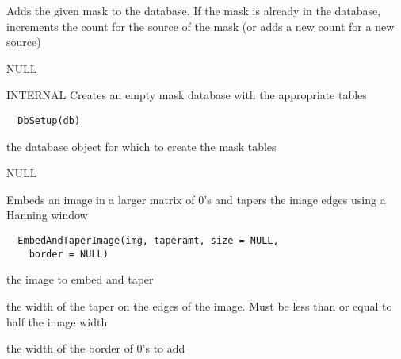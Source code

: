 \documentclass[a4paper]{book}
\begin{document}
%
\begin{Details}\relax
Adds the given mask to the database.  If the mask is
already in the database, increments the count for the
source of the mask (or adds a new count for a new source)
\end{Details}
%
\begin{Value}
NULL
\end{Value}
%
\begin{Description}\relax
INTERNAL Creates an empty mask database with the
appropriate tables
\end{Description}
%
\begin{Usage}
\begin{verbatim}
  DbSetup(db)
\end{verbatim}
\end{Usage}
%
\begin{Arguments}
\begin{ldescription}
\item[\code{db}] the database object for which to create the
mask tables
\end{ldescription}
\end{Arguments}
%
\begin{Value}
NULL
\end{Value}
%
\begin{Description}\relax
Embeds an image in a larger matrix of 0's and tapers the
image edges using a Hanning window
\end{Description}
%
\begin{Usage}
\begin{verbatim}
  EmbedAndTaperImage(img, taperamt, size = NULL,
    border = NULL)
\end{verbatim}
\end{Usage}
%
\begin{Arguments}
\begin{ldescription}
\item[\code{img}] the image to embed and taper

\item[\code{taperamt}] the width of the taper on the edges of
the image.  Must be less than or equal to half the image
width

\item[\code{border}] the width of the border of 0's to add
\end{ldescription}
\end{Arguments}
\end{document}
